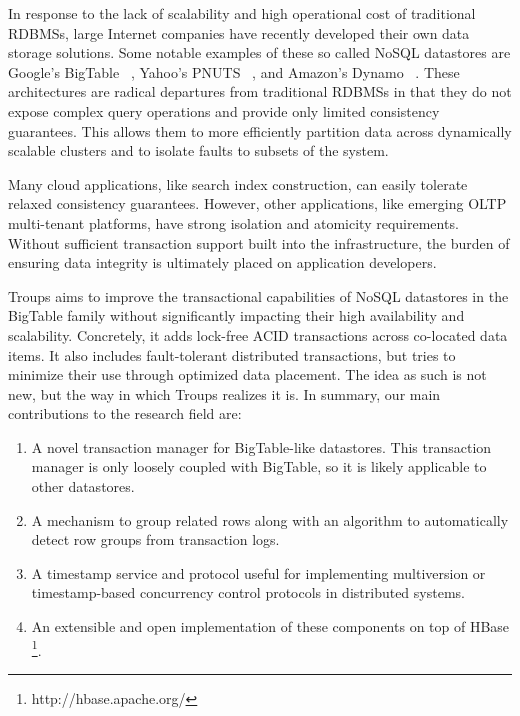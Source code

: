 \documentclass[10pt,final,journal]{IEEEtran}
\begin{document}
In response to the lack of scalability and high operational cost of traditional RDBMSs, large Internet companies have recently developed their own data storage solutions. Some notable examples of these so called NoSQL datastores are Google's BigTable ~\cite{Chang:2006:BDS:1267308.1267323}, Yahoo's PNUTS ~\cite{Cooper:2008:PYH:1454159.1454167}, and Amazon's Dynamo ~\cite{DeCandia:2007:DAH:1323293.1294281}. These architectures are radical departures from traditional RDBMSs in that they do not expose complex query operations and provide only limited consistency guarantees. This allows them to more efficiently partition data across dynamically scalable clusters and to isolate faults to subsets of the system.

Many cloud applications, like search index construction, can easily tolerate relaxed consistency guarantees. However, other applications, like emerging OLTP multi-tenant platforms, have strong isolation and atomicity requirements. Without sufficient transaction support built into the infrastructure, the burden of ensuring data integrity is ultimately placed on application developers.

Troups aims to improve the transactional capabilities of NoSQL datastores in the BigTable family without significantly impacting their high availability and scalability. Concretely, it adds lock-free ACID transactions across co-located data items. It also includes fault-tolerant distributed transactions, but tries to minimize their use through optimized data placement. The idea as such is not new, but the way in which Troups realizes it is. In summary, our main contributions to the research field are:

\begin{enumerate}
\item A novel transaction manager for BigTable-like datastores. This transaction manager is only loosely coupled with BigTable, so it is likely applicable to other datastores.
\item A mechanism to group related rows along with an algorithm to automatically detect row groups from transaction logs.
\item A timestamp service and protocol useful for implementing multiversion or timestamp-based concurrency control protocols in distributed systems.
\item An extensible and open implementation of these components on top of HBase \footnote{http://hbase.apache.org/}.
\end{enumerate}
\end{document}
